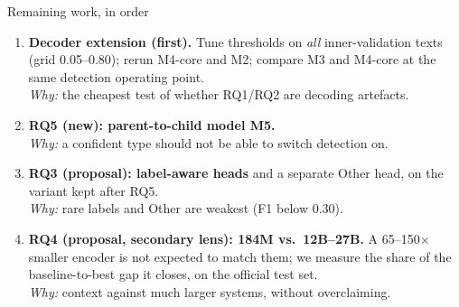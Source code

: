 \begin{frame}{Remaining work, in order}
\small
\begin{enumerate}
\item \textbf{Decoder extension (first).} Tune thresholds on \emph{all}
  inner-validation texts (grid 0.05--0.80); rerun M4-core and M2; compare M3 and
  M4-core at the same detection operating point.\\
  \emph{Why:} the cheapest test of whether RQ1/RQ2 are decoding artefacts.
\item \textbf{RQ5 (new): parent-to-child model M5.}\\
  \emph{Why:} a confident type should not be able to switch detection on.
\item \textbf{RQ3 (proposal): label-aware heads} and a separate Other head, on
  the variant kept after RQ5.\\
  \emph{Why:} rare labels and Other are weakest (F1 below 0.30).
\item \textbf{RQ4 (proposal, secondary lens): 184M vs.\ 12B--27B.}
  A 65--150$\times$ smaller encoder is not expected to match them; we measure
  the share of the baseline-to-best gap it closes, on the official test set.\\
  \emph{Why:} context against much larger systems, without overclaiming.
\end{enumerate}
\end{frame}

